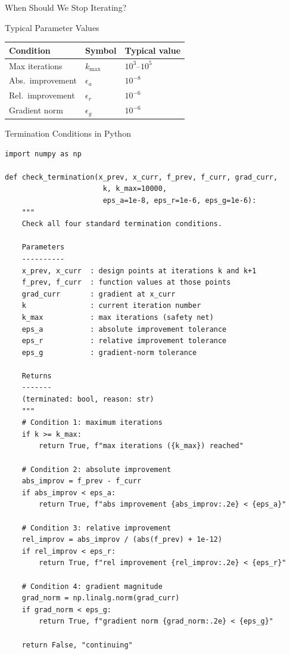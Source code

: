 \documentclass[aspectratio=169,10pt]{beamer}
\begin{document}
\begin{frame}[allowframebreaks]{When Should We Stop Iterating?}
  \begin{block}{Typical Parameter Values}
    \centering
    \begin{tabular}{lll}
      \toprule
      Condition        & Symbol        & Typical value \\
      \midrule
      Max iterations   & $k_{\max}$    & $10^3$--$10^5$ \\
      Abs.\ improvement & $\epsilon_a$ & $10^{-8}$ \\
      Rel.\ improvement & $\epsilon_r$ & $10^{-6}$ \\
      Gradient norm    & $\epsilon_g$  & $10^{-6}$ \\
      \bottomrule
    \end{tabular}
  \end{block}

\end{frame}

\begin{frame}[fragile]{Termination Conditions in Python}

\begin{lstlisting}[style=pycode]
import numpy as np

def check_termination(x_prev, x_curr, f_prev, f_curr, grad_curr,
                       k, k_max=10000,
                       eps_a=1e-8, eps_r=1e-6, eps_g=1e-6):
    """
    Check all four standard termination conditions.

    Parameters
    ----------
    x_prev, x_curr  : design points at iterations k and k+1
    f_prev, f_curr  : function values at those points
    grad_curr       : gradient at x_curr
    k               : current iteration number
    k_max           : max iterations (safety net)
    eps_a           : absolute improvement tolerance
    eps_r           : relative improvement tolerance
    eps_g           : gradient-norm tolerance

    Returns
    -------
    (terminated: bool, reason: str)
    """
    # Condition 1: maximum iterations
    if k >= k_max:
        return True, f"max iterations ({k_max}) reached"

    # Condition 2: absolute improvement
    abs_improv = f_prev - f_curr
    if abs_improv < eps_a:
        return True, f"abs improvement {abs_improv:.2e} < {eps_a}"

    # Condition 3: relative improvement
    rel_improv = abs_improv / (abs(f_prev) + 1e-12)
    if rel_improv < eps_r:
        return True, f"rel improvement {rel_improv:.2e} < {eps_r}"

    # Condition 4: gradient magnitude
    grad_norm = np.linalg.norm(grad_curr)
    if grad_norm < eps_g:
        return True, f"gradient norm {grad_norm:.2e} < {eps_g}"

    return False, "continuing"
\end{lstlisting}

\end{frame}
\end{document}
